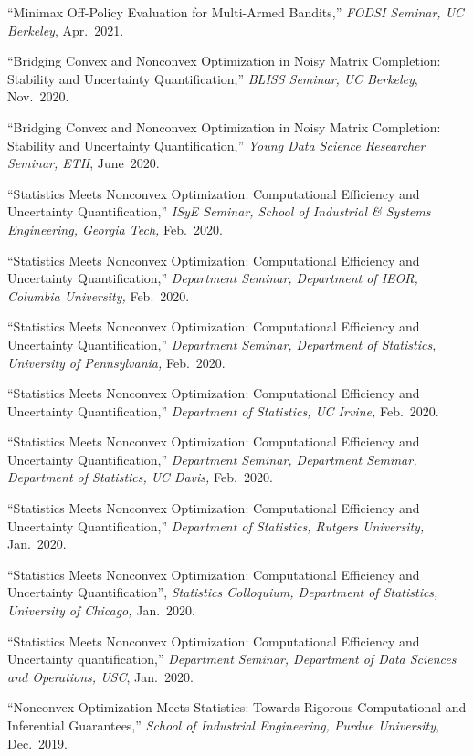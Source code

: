 \documentclass[a4paper, 10pt]{article}
\newenvironment{changemargin}[2]{%
  \begin{list}{}{%
    \setlength{\topsep}{0pt}%
    \setlength{\leftmargin}{#1}%
    \setlength{\rightmargin}{#2}%
    \setlength{\listparindent}{\parindent}%
    \setlength{\itemindent}{\parindent}%
    \setlength{\parsep}{\parskip}%
  }%
  \item[]}{\end{list}
}
\newenvironment{body} {
	\vspace*{-16pt}
	\begin{changemargin}{-0.3in}{-0.5in}
  }	
	{\end{changemargin}
}
\begin{document}
\begin{body}
\begin{enumerate}[label={[{T}{{\arabic*}}]}]
	\item ``Minimax Off-Policy Evaluation for Multi-Armed Bandits,'' \emph{FODSI Seminar, UC Berkeley}, Apr.~2021. 
	\item ``Bridging Convex and Nonconvex Optimization in Noisy Matrix Completion: Stability and Uncertainty Quantification,'' \emph{BLISS Seminar, UC Berkeley}, Nov.~2020.
	\item ``Bridging Convex and Nonconvex Optimization in Noisy Matrix Completion: Stability and Uncertainty Quantification,'' \emph{Young Data Science Researcher Seminar, ETH}, June~2020.
	\item ``Statistics Meets Nonconvex Optimization: Computational Efficiency and Uncertainty Quantification,'' \emph{ISyE Seminar, School of Industrial \& Systems Engineering, Georgia Tech, }Feb.~2020.
	\item ``Statistics Meets Nonconvex Optimization: Computational Efficiency and Uncertainty Quantification,'' \emph{Department Seminar, Department of IEOR, Columbia University, }Feb.~2020.
	\item ``Statistics Meets Nonconvex Optimization: Computational Efficiency and Uncertainty Quantification,'' \emph{Department Seminar, Department of Statistics, University of Pennsylvania, }Feb.~2020.
	\item ``Statistics Meets Nonconvex Optimization: Computational Efficiency and Uncertainty Quantification,'' \emph{Department of Statistics, UC Irvine, }Feb.~2020.
	\item ``Statistics Meets Nonconvex Optimization: Computational Efficiency and Uncertainty Quantification,'' \emph{Department Seminar, Department Seminar, Department of Statistics, UC Davis, }Feb.~2020.
	\item ``Statistics Meets Nonconvex Optimization: Computational Efficiency and Uncertainty Quantification,'' \emph{Department of Statistics, Rutgers University, }Jan.~2020.
	\item ``Statistics Meets Nonconvex Optimization: Computational Efficiency and Uncertainty Quantification'', \emph{Statistics Colloquium, Department of Statistics, University of Chicago,} Jan.~2020.
	\item ``Statistics Meets Nonconvex Optimization: Computational Efficiency and Uncertainty quantification,'' \emph{Department Seminar, Department of Data Sciences and Operations, USC}, Jan.~2020.
	\item ``Nonconvex Optimization Meets Statistics: Towards Rigorous Computational and Inferential Guarantees,'' \emph{School of Industrial Engineering, Purdue University}, Dec.~2019.

\end{enumerate}
\end{body}
\end{document}
